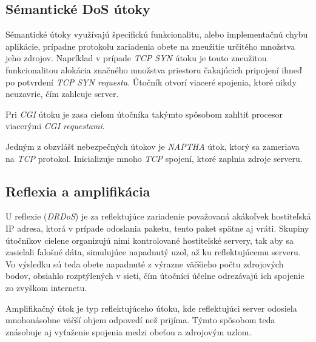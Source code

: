 \documentclass[
  digital, %
  table,   %
  lof,     %
  nolot,   %
  nocover
]{fithesis3}
\begin{document}
\subsection{Sémantické DoS útoky}
Sémantické útoky využívajú špecifickú funkcionalitu, alebo implementačnú chybu aplikácie,
prípadne protokolu zariadenia obete na zneužitie určitého množstva jeho zdrojov. Napríklad
v prípade \textit{TCP SYN} útoku je touto zneužitou funkcionalitou alokácia značného množstva
priestoru čakajúcich pripojení ihneď po potvrdení \textit{ TCP SYN requestu}. Útočník otvorí
viaceré spojenia, ktoré nikdy neuzavrie, čím zahlcuje server. 

Pri \textit{CGI} útoku je zasa cieľom útočníka takýmto spôsobom zahltiť procesor viacerými
\textit{CGI requestami}.

Jedným z obzvlášť nebezpečných útokov je \textit{NAPTHA} útok, ktorý sa zameriava na
\textit{TCP} protokol. Inicializuje mnoho \textit{TCP} spojení, ktoré zaplnia zdroje serveru.

\subsection{Reflexia a amplifikácia}
U reflexie (\textit{DRDoS}) je za reflektujúce zariadenie považovaná akákoľvek hostiteľská IP adresa, 
ktorá v prípade odoslania
paketu, tento paket spätne aj vráti.
Skupiny útočníkov cielene organizujú nimi kontrolované hostiteľské servery, tak aby sa zasielali 
falošné dáta, simulujúce napadnutý uzol, až ku reflektujúcemu serveru. Vo výsledku sú teda obete 
napadnuté z výrazne väčšieho počtu zdrojových bodov, obsiahlo rozptýlených v sieti, čím útočníci účelne 
odrezávajú ich spojenie zo zvyškom internetu.

Amplifikačný útok je typ reflektujúceho útoku, kde reflektujúci server odosiela mnohonásobne väčší 
objem odpovedí než prijíma. Týmto spôsobom teda znásobuje aj vyťaženie spojenia medzi obeťou a 
zdrojovým uzlom.
\end{document}
